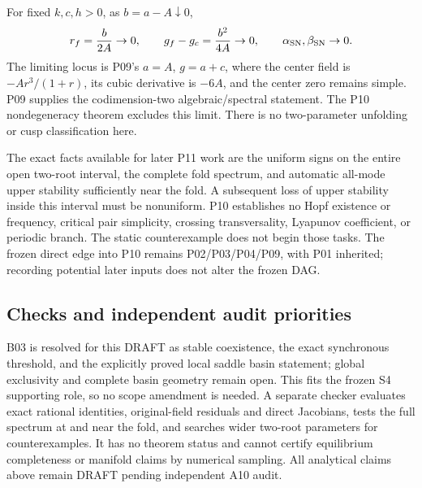 For fixed $k,c,h>0$, as $b=a-A\downarrow0$,
\begin{equation}
 r_f=\frac b{2A}\to0,\qquad g_f-g_c=\frac{b^2}{4A}\to0,
 \qquad \alpha_{\rm SN},\beta_{\rm SN}\to0.
 \label{eq:P10-degenerate-limit}
\end{equation}
The limiting locus is P09's $a=A$, $g=a+c$, where the center field
is $-Ar^3/(1+r)$, its cubic derivative is $-6A$, and the center
zero remains simple. P09 supplies the codimension-two algebraic/spectral
statement. The P10 nondegeneracy theorem excludes this limit.
There is no two-parameter unfolding or cusp classification here.

The exact facts available for later P11 work are the uniform signs
on the entire open two-root interval, the complete fold spectrum,
and automatic all-mode upper stability sufficiently near the fold.
A subsequent loss of upper stability inside this interval must be
nonuniform. P10 establishes no Hopf existence or frequency, critical
pair simplicity, crossing transversality, Lyapunov coefficient, or
periodic branch. The static counterexample does not begin those tasks.
The frozen direct edge into P10 remains P02/P03/P04/P09, with P01
inherited; recording potential later inputs does not alter the frozen DAG.

\subsection{Checks and independent audit priorities}

B03 is resolved for this DRAFT as stable coexistence, the exact
synchronous threshold, and the explicitly proved local saddle basin
statement; global exclusivity and complete basin geometry remain open.
This fits the frozen S4 supporting role, so no scope amendment is needed.
A separate checker evaluates exact rational identities, original-field
residuals and direct Jacobians, tests the full spectrum at and near the
fold, and searches wider two-root parameters for counterexamples.
It has no theorem status and cannot certify equilibrium completeness
or manifold claims by numerical sampling. All analytical claims above
remain DRAFT pending independent A10 audit.

